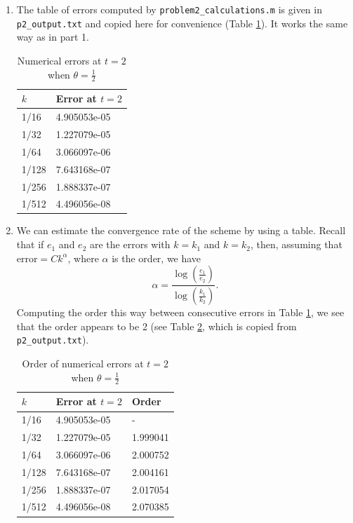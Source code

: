 \documentclass{homework}
\begin{document}
\begin{enumerate}
\begin{enumerate}[label={(\alph*)}]
			\item The table of errors computed by \lstinline{problem2_calculations.m} is given in \lstinline{p2_output.txt} and copied here for convenience (Table \ref{tab:p2:2:b}). It works the same way as in part 1.
			
			\begin{table}[h]
				\centering
				\begin{tabular}{@{}ll@{}}
					\toprule
					$k$ & Error at $t=2$ \\
					\midrule
					1/16 & 4.905053e-05 \\
					1/32 & 1.227079e-05 \\
					1/64 & 3.066097e-06 \\
					1/128 & 7.643168e-07 \\
					1/256 & 1.888337e-07 \\
					1/512 & 4.496056e-08 \\
					\bottomrule
				\end{tabular}
				\caption{Numerical errors at $t=2$ when $\theta = \frac{1}{2}$}
				\label{tab:p2:2:b}
			\end{table}
			
			\item We can estimate the convergence rate of the scheme by using a table. Recall that if $e_1$ and $e_2$ are the errors with $k=k_1$ and $k=k_2$, then, assuming that $\text{error} = Ck^\alpha$, where $\alpha$ is the order, we have
			\begin{equation*}
				\alpha = \frac{\log\left(\frac{e_1}{e_2}\right)}{\log\left(\frac{k_1}{k_2}\right)}.
			\end{equation*}
			Computing the order this way between consecutive errors in Table \ref{tab:p2:2:b}, we see that the order appears to be 2 (see Table \ref{tab:p2:2:c}, which is copied from \lstinline{p2_output.txt}).
			
			\begin{table}[h]
				\centering
				\begin{tabular}{@{}lll@{}}
					\toprule
					$k$ & Error at $t=2$ & Order\\
					\midrule
					1/16 & 4.905053e-05 & -\\
					1/32 & 1.227079e-05 & 1.999041\\
					1/64 & 3.066097e-06 & 2.000752 \\
					1/128 & 7.643168e-07 & 2.004161\\
					1/256 & 1.888337e-07 & 2.017054\\
					1/512 & 4.496056e-08 & 2.070385\\
					\bottomrule
				\end{tabular}
				\caption{Order of numerical errors at $t=2$ when $\theta = \frac{1}{2}$}
				\label{tab:p2:2:c}
			\end{table}
		\end{enumerate}
	\end{enumerate}
\end{document}
